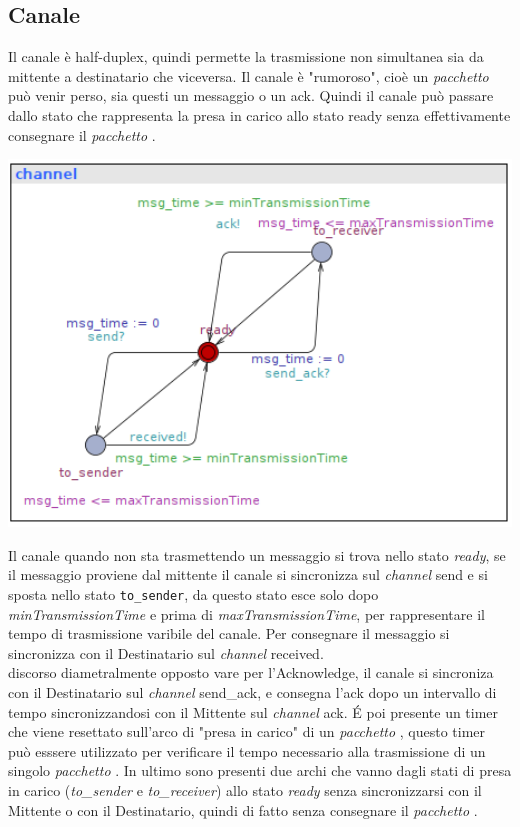 \documentclass[a4paper]{article}
\newcommand{\channel}{\textit{channel }}
\newcommand{\pacchetto}{\textit{pacchetto }}
\begin{document}
\subsection{Canale}
Il canale è half-duplex, quindi permette la trasmissione non simultanea sia da mittente a destinatario che viceversa.
Il canale è "rumoroso", cioè un \textit{\pacchetto}può venir perso, sia questi un messaggio o un ack. Quindi il canale può passare dallo stato che rappresenta la presa in carico allo stato ready senza effettivamente consegnare il \pacchetto.\\
\begin{center}\includegraphics[width=1\textwidth]{channel_unsafe.png}\end{center}
Il canale quando non sta trasmettendo un messaggio si trova nello stato \textit{ready}, se il messaggio proviene dal mittente il canale si sincronizza sul \channel send e si sposta nello stato \texttt{to\_sender}, da questo stato esce solo dopo \textit{minTransmissionTime} e prima di \textit{maxTransmissionTime}, per rappresentare il tempo di trasmissione varibile del canale.
Per consegnare il messaggio si sincronizza con il Destinatario sul \channel received.\\
discorso diametralmente opposto vare per l'Acknowledge, il canale si sincroniza con il Destinatario sul \channel send\_ack, e consegna l'ack dopo un intervallo di tempo sincronizzandosi con il Mittente sul \channel ack.
É poi presente un timer che viene resettato sull'arco di "presa in carico" di un \pacchetto, questo timer può esssere utilizzato per verificare il tempo necessario alla trasmissione di un singolo \pacchetto.
In ultimo sono presenti due archi che vanno dagli stati di presa in carico (\textit{to\_sender} e \textit{to\_receiver}) allo stato \textit{ready} senza sincronizzarsi con il Mittente o con il Destinatario, quindi di fatto senza consegnare il \pacchetto.
\end{document}
